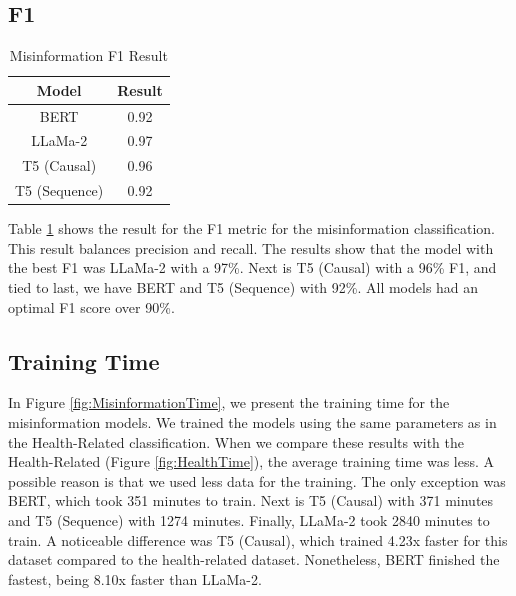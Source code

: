 \subsection{F1}
\begin{table}[H]
	\centering
	\caption{Misinformation F1 Result}
	\begin{tabular}{||c | c||} 
		\hline
		\textbf{Model} & \textbf{Result} \\ [0.5ex] 
		\hline
		BERT & 0.92  \\
		\hline
		LLaMa-2 & 0.97 \\ 
		\hline
		T5 (Causal) & 0.96 \\
		\hline
		T5 (Sequence) & 0.92 \\
		\hline
	\end{tabular}
	\label{table:MisinformationF1}
\end{table}


Table \ref{table:MisinformationF1}  shows the result for the F1 metric for the misinformation classification. This result balances precision and recall. The results show that the model
with the best F1 was LLaMa-2 with a 97\%. Next is T5 (Causal) with a 96\% F1, and tied to last, we have BERT and T5 (Sequence) with 92\%. All models had an optimal F1 score over 90\%.


\subsection{Training Time}

In Figure \ref{fig:MisinformationTime}, we present the training time for the misinformation models. We trained the models using the same parameters as in the Health-Related classification.
When we compare these results with the Health-Related (Figure \ref{fig:HealthTime}), the average training time was less. A possible reason is that we used less data for the training. The
only exception was BERT, which took 351 minutes to train. Next is T5 (Causal) with 371 minutes and T5 (Sequence) with 1274 minutes. Finally, LLaMa-2 took 2840 minutes to train. A noticeable difference was T5 (Causal), which trained 4.23x faster for this dataset compared to the health-related dataset. Nonetheless, BERT finished the fastest, being 8.10x faster than LLaMa-2.


